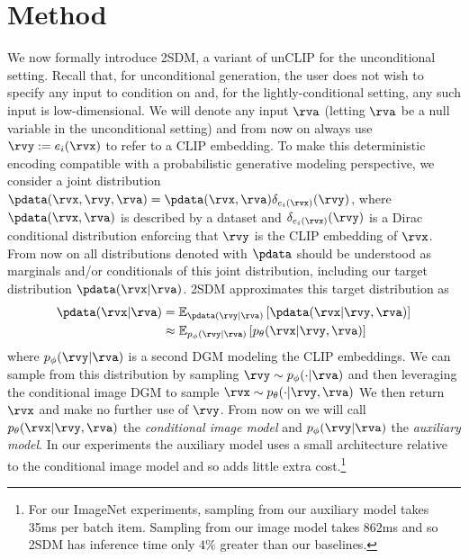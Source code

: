 \section{Method} \label{sec:method}
We now formally introduce 2SDM, a variant of unCLIP for the unconditional setting. Recall that, for unconditional generation, the user does not wish to specify any input to condition on and, for the lightly-conditional setting, any such input is low-dimensional. We will denote any input $\rva$ (letting $\rva$ be a null variable in the unconditional setting) and from now on always use $\rvy := e_i(\rvx)$ to refer to a CLIP embedding. To make this deterministic encoding compatible with a probabilistic generative modeling perspective, we consider a joint distribution $\pdata(\rvx, \rvy, \rva)=\pdata(\rvx, \rva)\delta_{e_i(\rvx)}(\rvy)$, where $\pdata(\rvx, \rva)$ is described by a dataset and $\delta_{e_i(\rvx)}(\rvy)$ is a Dirac conditional distribution enforcing that $\rvy$ is the CLIP embedding of $\rvx$. From now on all distributions denoted with $\pdata$ should be understood as marginals and/or conditionals of this joint distribution, including our target distribution $\pdata(\rvx|\rva)$. 2SDM approximates this target distribution as
%
\begin{align} \label{eq:no-a}
    \pdata(\rvx|\rva) &= \mathbb{E}_{\pdata(\rvy|\rva)} \left[ \pdata(\rvx|\rvy,\rva) \right] \\
    &\approx \mathbb{E}_{p_\phi(\rvy|\rva)} \left[ p_\theta(\rvx|\rvy,\rva) \right] %
\end{align}
where $p_\phi(\rvy|\rva)$ is a second DGM modeling the CLIP embeddings. We can sample from this distribution by sampling $\rvy\sim p_\phi(\cdot|\rva)$ and then leveraging the conditional image DGM to sample $\rvx \sim p_\theta(\cdot|\rvy,\rva)$ We then return $\rvx$ and make no further use of $\rvy$.
%
From now on we will call $p_\theta(\rvx|\rvy,\rva)$ the \textit{conditional image model} and $p_\phi(\rvy|\rva)$ the \textit{auxiliary model}. In our experiments the auxiliary model uses a small architecture relative to the conditional image model and so adds little extra cost.\footnote{For our ImageNet experiments, sampling from our auxiliary model takes 35ms per batch item. Sampling from our image model takes 862ms and so 2SDM has inference time only $4\%$ greater than our baselines.}



